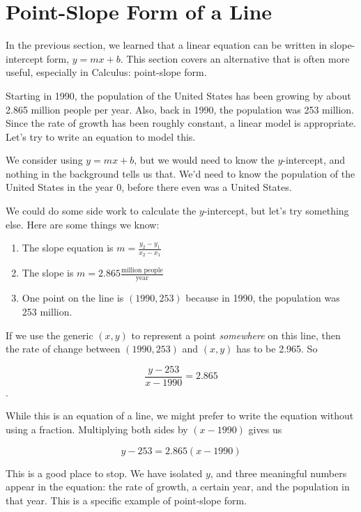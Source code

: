 \documentclass[nooutcomes]{ximera}
\begin{document}

\section{Point-Slope Form of a Line}

In the previous section, we learned that a linear equation can be written in slope-intercept form, $y=mx+b$. This section covers an alternative that is often more useful, especially in Calculus: point-slope form.

\begin{example}
Starting in 1990, the population of the United States has been growing by about 2.865  million people per year. Also, back in 1990, the population was 253 million. Since the rate of growth has been roughly constant, a linear model is appropriate. Let's try to write an equation to model this.

\begin{explanation}
We consider using $y=mx+b$, but we would need to know the $y$-intercept, and nothing in the background tells us that. We'd need to know the population of the United States in the year 0, before there even was a United States.

We could do some side work to calculate the $y$-intercept, but let's try something else. Here are some things we know:
\begin{enumerate}
\item The slope equation is $m=\frac{y_2-y_1}{x_2-x_1}$
\item The slope is $m=2.865 \frac{\text{million people}}{\text{year}}$
\item One point on the line is $(1990,253)$ because in 1990, the population was 253 million.
\end{enumerate}

If we use the generic $(x,y)$ to represent a point \textit{somewhere} on this line, then the rate of change between $(1990,253)$ and $(x,y)$  has to be 2.965.  So

$$\frac{y-253}{x-1990}=2.865$$.

While this is an equation of a line, we might prefer to write the equation without using a fraction.  Multiplying both sides by $(x-1990)$ gives us

$$y-253=2.865(x-1990)$$

This is a good place to stop. We have isolated $y$, and three meaningful numbers appear in the equation: the rate of growth, a certain year, and the population in that year. This is a specific example of point-slope form. 
\end{explanation}
\end{example}
\end{document}
